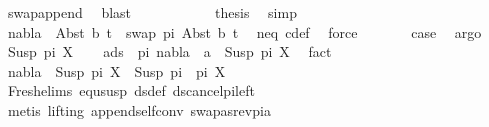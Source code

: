 \begin{isabellebody}
\ swap{\isacharunderscore}{\kern0pt}append\ \isamarkupfalse%
\ blast\isanewline
\ \ \ \ \ \ \ \ \isamarkupfalse%
\ \isamarkupfalse%
\ {\isacharquery}{\kern0pt}thesis\ \isamarkupfalse%
\ simp\isanewline
\ \ \ \ \ \ \isamarkupfalse%
\isanewline
\ \ \ \ \isamarkupfalse%
\isanewline
\ \ \ \isamarkupfalse%
\ \isamarkupfalse%
\ {\isachardoublequoteopen}nabla\ {\isasymturnstile}\ Abst\ b\ t{\isacharprime}{\kern0pt}\ {\isasymapprox}\ swap\ pi\ {\isacharparenleft}{\kern0pt}Abst\ b\ t{\isacharprime}{\kern0pt}{\isacharparenright}{\kern0pt}{\isachardoublequoteclose}\ \isamarkupfalse%
\ neq\ c{\isacharunderscore}{\kern0pt}def\ \isamarkupfalse%
\ force\isanewline
\ \isakeywordONE{{\isacharbraceright}{\kern0pt}}\isamarkupfalse%
\isanewline
\ \ \isamarkupfalse%
\ \isamarkupfalse%
\ {\isacharquery}{\kern0pt}case\ \isamarkupfalse%
\ argo\isanewline
{}\isamarkupfalse%
\isanewline
\ \ \isamarkupfalse%
\ {\isacharparenleft}{\kern0pt}Susp\ pi{\isacharprime}{\kern0pt}\ X{\isacharparenright}{\kern0pt}\isanewline
\ \ \isamarkupfalse%
\ {\isachardoublequoteopen}{\isasymforall}a{\isasymin}ds\ {\isacharbrackleft}{\kern0pt}{\isacharbrackright}{\kern0pt}\ pi{\isachardot}{\kern0pt}\ nabla\ {\isasymturnstile}\ a\ {\isasymsharp}\ Susp\ pi{\isacharprime}{\kern0pt}\ X{\isachardoublequoteclose}\ \isamarkupfalse%
\ fact\isanewline
\ \ \isamarkupfalse%
\ \isamarkupfalse%
\ {\isachardoublequoteopen}nabla\ {\isasymturnstile}\ Susp\ pi{\isacharprime}{\kern0pt}\ X\ {\isasymapprox}\ Susp\ {\isacharparenleft}{\kern0pt}pi\ {\isacharat}{\kern0pt}\ pi{\isacharprime}{\kern0pt}{\isacharparenright}{\kern0pt}\ X{\isachardoublequoteclose}\isanewline
\ \ \ \isamarkupfalse%
\ Fresh{\isacharunderscore}{\kern0pt}elims{\isacharparenleft}{\kern0pt}{}{\isacharparenright}{\kern0pt}\ equ{\isacharunderscore}{\kern0pt}susp\ ds{\isacharunderscore}{\kern0pt}def\ ds{\isacharunderscore}{\kern0pt}cancel{\isacharunderscore}{\kern0pt}pi{\isacharunderscore}{\kern0pt}left\isanewline
\ \ \ \isamarkupfalse%
\ {\isacharparenleft}{\kern0pt}metis\ {\isacharparenleft}{\kern0pt}lifting{\isacharparenright}{\kern0pt}\ append{\isacharunderscore}{\kern0pt}self{\isacharunderscore}{\kern0pt}conv{}\ swapas{\isacharunderscore}{\kern0pt}rev{\isacharunderscore}{\kern0pt}pi{\isacharunderscore}{\kern0pt}a{\isacharparenright}{\kern0pt}\isanewline

\end{isabellebody}
